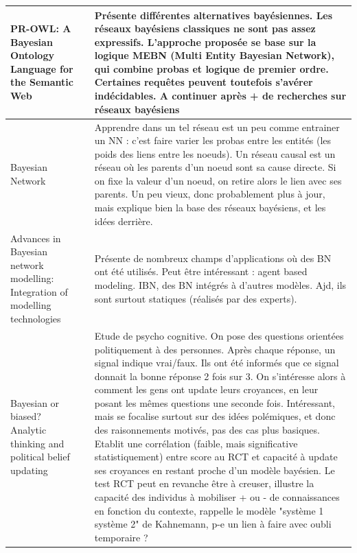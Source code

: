 \documentclass[french]{article}
\begin{document}
    \begin{table}[ht!]
        \begin{center}
        \begin{tabular}{|p{}|p{}|p{}|}

            \hline
            PR-OWL: A Bayesian Ontology Language for the Semantic Web \cite{da_costa_pr-owl_2008}
            &
            & Présente différentes alternatives bayésiennes. Les réseaux bayésiens classiques ne sont pas assez expressifs. L'approche proposée se base sur la logique MEBN (Multi Entity Bayesian Network), qui combine probas et logique de premier ordre. Certaines requêtes peuvent toutefois s'avérer indécidables. A continuer après + de recherches sur réseaux bayésiens\\
            \hline
            Bayesian Network \cite{pearl_bayesian_2011}
            &
            & Apprendre dans un tel réseau est un peu comme entrainer un NN : c'est faire varier les probas entre les entités (les poids des liens entre les noeuds). Un réseau causal est un réseau où les parents d'un noeud sont sa cause directe. Si on fixe la valeur d'un noeud, on retire alors le lien avec ses parents. Un peu vieux, donc probablement plus à jour, mais explique bien la base des réseaux bayésiens, et les idées derrière.
            \\
            \hline
            Advances in Bayesian network modelling: Integration of modelling technologies \cite{marcot_advances_2019}
            &
            & Présente de nombreux champs d'applications où des BN ont été utilisés. Peut être intéressant : agent based modeling. IBN, des BN intégrés à d'autres modèles. Ajd, ils sont surtout statiques (réalisés par des experts).
            \\
            \hline
            Bayesian or biased? Analytic thinking and political belief updating  \cite{tappin_bayesian_2020}
            & 
            & Etude de psycho cognitive. On pose des questions orientées politiquement à des personnes. Après chaque réponse, un signal indique vrai/faux. Ils ont été informés que ce signal donnait la bonne réponse 2 fois sur 3. On s'intéresse alors à comment les gens ont update leurs croyances, en leur posant les mêmes questions une seconde fois. Intéressant, mais se focalise surtout sur des idées polémiques, et donc des raisonnements motivés, pas des cas plus basiques. Etablit une corrélation (faible, mais significative statistiquement) entre score au RCT et capacité à update ses croyances en restant proche d'un modèle bayésien. Le test RCT peut en revanche être à creuser, illustre la capacité des individus à mobiliser + ou - de connaissances en fonction du contexte, rappelle le modèle "système 1 système 2" de Kahnemann, p-e un lien à faire avec oubli temporaire ?

\end{tabular}
\end{center}
\end{table}
\end{document}
